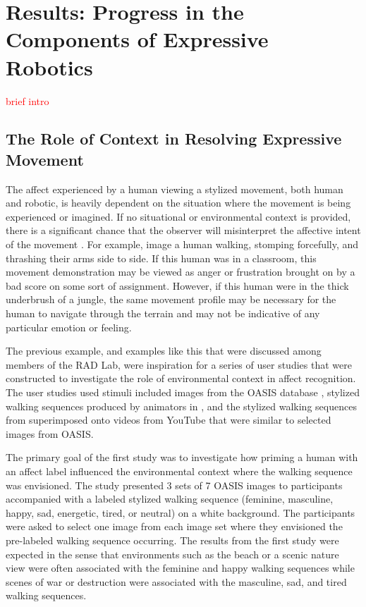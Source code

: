 \documentclass[arts,article,submit,moreauthors,pdftex,10pt,a4paper]{mdpi}
\begin{document}
\section{Results: Progress in the Components of Expressive Robotics}

\textcolor{red}{brief intro}

\subsection{The Role of Context in Resolving Expressive Movement}

The affect experienced by a human viewing a stylized movement, both human and robotic, is heavily dependent on the situation where the movement is being experienced or imagined. If no situational or environmental context is provided, there is a significant chance that the observer will misinterpret the affective intent of the movement \cite{zeng2009survey}. For example, image a human walking, stomping forcefully, and thrashing their arms side to side. If this human was in a classroom, this movement demonstration may be viewed as anger or frustration brought on by a bad score on some sort of assignment. However, if this human were in the thick underbrush of a jungle, the same movement profile may be necessary for the human to navigate through the terrain and may not be indicative of any particular emotion or feeling. 

The previous example, and examples like this that were discussed among members of the RAD Lab, were inspiration for a series of user studies that were constructed to investigate the role of environmental context in affect recognition. The user studies used stimuli included images from the OASIS database \cite{kurdi2017introducing}, stylized walking sequences produced by animators in \cite{etemad2016expert}, and the stylized walking sequences from \cite{etemad2016expert} superimposed onto videos from YouTube that were similar to selected images from OASIS. 

The primary goal of the first study was to investigate how priming a human with an affect label influenced the environmental context where the walking sequence was envisioned. The study presented 3 sets of 7 OASIS images to participants accompanied with a labeled stylized walking sequence (feminine, masculine, happy, sad, energetic, tired, or neutral) on a white background. The participants were asked to select one image from each image set where they envisioned the pre-labeled walking sequence occurring. The results from the first study were expected in the sense that environments such as the beach or a scenic nature view were often associated with the feminine and happy walking sequences while scenes of war or destruction were associated with the masculine, sad, and tired walking sequences.
\end{document}
